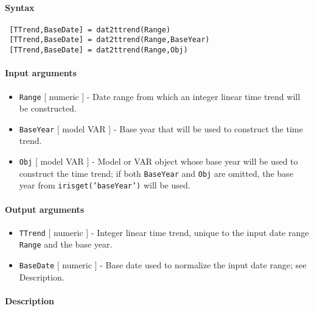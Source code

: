 


	\paragraph{Syntax}
 
 \begin{verbatim}
 [TTrend,BaseDate] = dat2ttrend(Range)
 [TTrend,BaseDate] = dat2ttrend(Range,BaseYear)
 [TTrend,BaseDate] = dat2ttrend(Range,Obj)
 \end{verbatim}
 
 \paragraph{Input arguments}
 
 \begin{itemize}
 \item
   \texttt{Range} {[} numeric {]} - Date range from which an integer
   linear time trend will be constructed.
 \item
   \texttt{BaseYear} {[} model \textbar{} VAR {]} - Base year that will
   be used to construct the time trend.
 \item
   \texttt{Obj} {[} model \textbar{} VAR {]} - Model or VAR object whose
   base year will be used to construct the time trend; if both
   \texttt{BaseYear} and \texttt{Obj} are omitted, the base year from
   \texttt{irisget('baseYear')} will be used.
 \end{itemize}
 
 \paragraph{Output arguments}
 
 \begin{itemize}
 \item
   \texttt{TTrend} {[} numeric {]} - Integer linear time trend, unique to
   the input date range \texttt{Range} and the base year.
 \item
   \texttt{BaseDate} {[} numeric {]} - Base date used to normalize the
   input date range; see Description.
 \end{itemize}
 
 \paragraph{Description}
 
